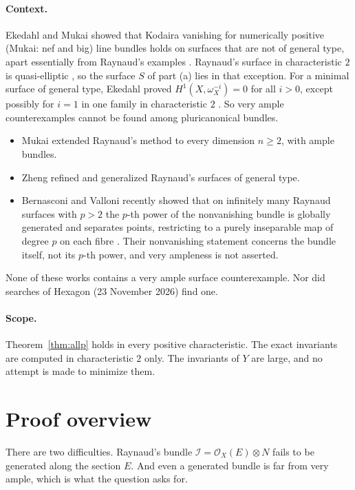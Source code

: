 \documentclass[11pt,a4paper]{article}
\theoremstyle{plain}
\theoremstyle{remark}
\newcommand{\OO}{\mathcal O}
\begin{document}
\paragraph{Context.} Ekedahl and Mukai showed that Kodaira vanishing for numerically positive (Mukai: nef and big)
line bundles holds on surfaces that are not of general type, apart essentially from Raynaud's examples
\cite[p.~99 and Theorem~II.1.3]{Ekedahl}\cite[Theorem~3]{Mukai}. Raynaud's surface in characteristic $2$ is
quasi-elliptic \cite[Remarque~1, pp.~277--278]{Raynaud}, so the surface $S$ of part (a) lies in that exception. For a
minimal surface of general type, Ekedahl proved $H^1(X,\omega_X^{-i})=0$ for all $i>0$, except possibly for $i=1$ in
one family in characteristic $2$ \cite[Main theorem~(i), p.~97]{Ekedahl}. So very ample counterexamples cannot be
found among pluricanonical bundles.
\begin{itemize}
\item Mukai \cite[Theorem~2]{Mukai} extended Raynaud's method to every dimension $n\ge2$, with ample bundles.
\item Zheng \cite{Zheng} refined and generalized Raynaud's surfaces of general type.
\item Bernasconi and Valloni recently showed that on infinitely many Raynaud surfaces with $p>2$ the $p$-th power of
the nonvanishing bundle is globally generated and separates points, restricting to a purely inseparable map of degree
$p$ on each fibre \cite[Theorem~1.2 and Propositions~3.13--3.14]{BV}. Their nonvanishing statement concerns the
bundle itself, not its $p$-th power, and very ampleness is not asserted.
\end{itemize}
None of these works contains a very ample surface counterexample. Nor did searches of Hexagon (23 November 2026)
find one.

\paragraph{Scope.} Theorem~\ref{thm:allp} holds in every positive characteristic. The exact
invariants are computed in characteristic $2$ only. The invariants of $Y$ are large, and no attempt is made to
minimize them.

\section{Proof overview}

There are two difficulties. Raynaud's bundle $\mathcal I=\OO_X(E)\otimes N$ fails to be generated along the section
$E$. And even a generated bundle is far from very ample, which is what the question asks for.
\end{document}
